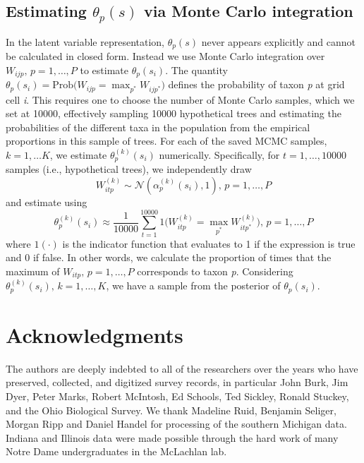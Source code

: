 \documentclass[10pt,letterpaper]{article}
\newcommand{\N}{\mathcal{N}}
\begin{document}
\subsection*{Estimating $\theta_{p}(s)$ via Monte Carlo integration}
\label{SI1}
In the latent variable representation, $\theta_{p}(s)$ never appears
explicitly and cannot be calculated in closed form. Instead we use
Monte Carlo integration over $W_{ijp},\, p=1,\ldots,P$ to estimate
$\theta_{p}(s_{i})$. The quantity $\theta_{p}(s_{i})=\mbox{Prob}(W_{ijp}={\displaystyle \max_{p^{*}}W_{ijp^{*}})}$
defines the probability of taxon \emph{p} at grid cell \emph{i}. This requires
one to choose the number of Monte Carlo samples, which we set at 10000,
effectively sampling 10000 hypothetical trees and estimating the probabilities
of the different taxa in the population from the empirical proportions
in this sample of trees. For each of the saved MCMC samples, $k=1,\ldots K$,
we estimate $\theta_{p}^{(k)}(s_{i})$ numerically. Specifically,
for $t=1,\ldots,10000$ samples (i.e., hypothetical trees), we independently
draw
\[
W_{itp}^{(k)}\sim\N(\alpha_{p}^{(k)}(s_{i}),1),\, p=1,\ldots,P
\]
and estimate using 
\[
\theta_{p}^{(k)}(s_{i})\approx\frac{1}{10000}{\displaystyle \sum_{t=1}^{10000}1(W_{itp}^{(k)}={\displaystyle \max_{p^{*}}W_{itp^{*}}^{(k)})}},\, p=1,\ldots,P
\]
where $1(\cdot)$ is the indicator function that evaluates to 1 if
the expression is true and 0 if false. In other words, we calculate
the proportion of times that the maximum of $W_{itp},\, p=1,\ldots,P$
corresponds to taxon \emph{p}. Considering $\theta_{p}^{(k)}(s_{i}),\, k=1,\ldots,K$,
we have a sample from the posterior of $\theta_{p}(s_{i})$.

\section*{Acknowledgments}
The authors are deeply indebted to all of the researchers over the
years who have preserved, collected, and digitized survey records,
in particular John Burk, Jim Dyer, Peter Marks, Robert McIntosh, Ed
Schools, Ted Sickley, Ronald Stuckey, and the Ohio Biological Survey.
We thank Madeline Ruid, Benjamin Seliger, Morgan Ripp and Daniel Handel
for processing of the southern Michigan data. Indiana and Illinois
data were made possible through the hard work of many Notre Dame undergraduates
in the McLachlan lab. 
\end{document}
